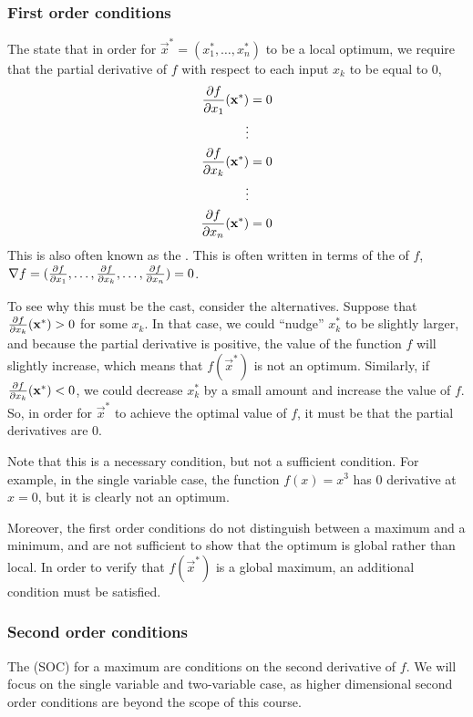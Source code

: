 \subsubsection*{First order conditions}
The  state that in order for $\vec{x}^* = (x_1^*, \dots, x_n^*)$ to be a local optimum, we require that the partial derivative of $f$ with respect to each input $x_k$ to be equal to 0, 
\begin{align*}
    \frac{\partial f}{\partial x_1}(\mathbf{x}^*) &= 0 \\
    \vdots \\
    \frac{\partial f}{\partial x_k}(\mathbf{x}^*) &= 0 \\
    \vdots \\
    \frac{\partial f}{\partial x_n}(\mathbf{x}^*) &= 0
\end{align*}
This is also often known as the . This is often written in terms of the  of $f$, $\nabla f = (\frac{\partial f}{\partial x_1}, \dots, \frac{\partial f}{\partial x_k}, \dots, \frac{\partial f}{\partial x_n}) = 0$.

To see why this must be the cast, consider the alternatives. Suppose that $\frac{\partial f}{\partial x_k}(\mathbf{x}^*) > 0$ for some $x_k$. In that case, we could ``nudge'' $x_k^*$ to be slightly larger, and because the partial derivative is positive, the value of the function $f$ will slightly increase, which means that $f(\vec{x}^*)$ is not an optimum. Similarly, if $\frac{\partial f}{\partial x_k}(\mathbf{x}^*) < 0$, we could decrease $x_k^*$ by a small amount and increase the value of $f$. So, in order for $\vec{x}^*$ to achieve the optimal value of $f$, it must be that the partial derivatives are 0. 

Note that this is a necessary condition, but not a sufficient condition. For example, in the single variable case, the function $f(x) = x^3$ has 0 derivative at $x = 0$, but it is clearly not an optimum. 


Moreover, the first order conditions do not distinguish between a maximum and a minimum, and are not sufficient to show that the optimum is global rather than local. In order to verify that $f(\vec{x}^*)$ is a global maximum, an additional condition must be satisfied. 


\subsubsection*{Second order conditions}
The  (SOC) for a maximum are conditions on the second derivative of $f$. We will focus on the single variable and two-variable case, as higher dimensional second order conditions are beyond the scope of this course.

